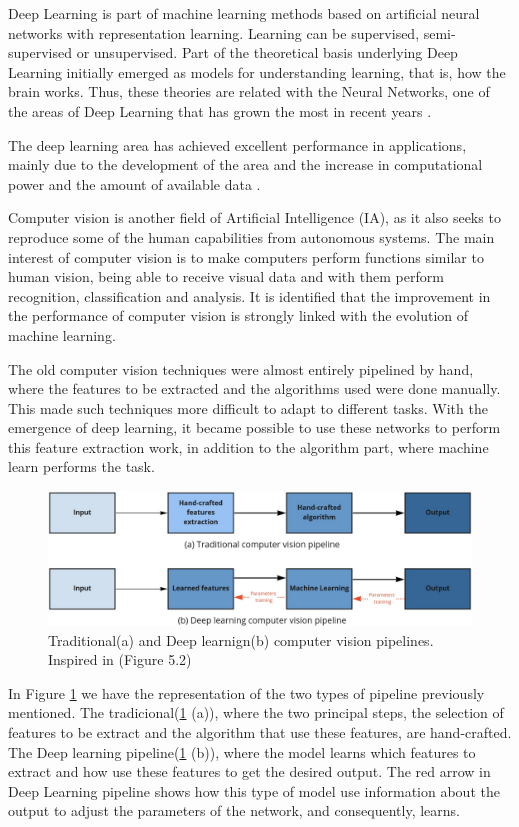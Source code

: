  Deep Learning is part of machine learning methods based on artificial neural networks with representation learning. Learning can be supervised, semi-supervised or unsupervised. Part of the theoretical basis underlying Deep Learning  initially emerged as models for understanding learning, that is, how the brain works. Thus, these theories are related with the Neural Networks, one of the areas of Deep Learning  that has grown the most in recent years \cite{goodfellow2016}.

The deep learning area has achieved excellent performance in applications, mainly due to the development of the area and the increase in computational power and the amount of available data \cite{geron2019}. 

Computer vision is another field of Artificial Intelligence (IA), as it also seeks to reproduce some of the human capabilities from autonomous systems. The main interest of computer vision is to make computers perform functions similar to human vision, being able to receive visual data and with them perform recognition, classification and analysis. It is identified that the improvement in the performance of computer vision is strongly linked with the evolution of machine learning.

The old computer vision techniques were almost entirely pipelined by hand, where the features to be extracted and the algorithms used were done manually. This made such techniques more difficult to adapt to different tasks. With the emergence of deep learning, it became possible to use these networks to perform this feature extraction work, in addition to the algorithm part, where machine learn performs the task.

\begin{figure}
    \centering
    \includegraphics[scale=0.20]{images/cvpipeline.png}
    \caption{Traditional(a) and Deep learnign(b) computer vision pipelines. Inspired in \cite{szeliski2010computer}(Figure 5.2)}
    \label{fig:figurecvpipeline}
\end{figure}

In Figure \ref{fig:figurecvpipeline} we have the representation of the two types of pipeline previously mentioned. The tradicional(\ref{fig:figurecvpipeline} (a)), where the two principal steps, the selection of features to be extract and the algorithm that use these features, are hand-crafted. The Deep learning pipeline(\ref{fig:figurecvpipeline} (b)), where the model learns which features to extract and how use these features to get the desired output. The red arrow in Deep Learning pipeline shows how this type of model use information about the output to adjust the parameters of the network, and consequently, learns.

